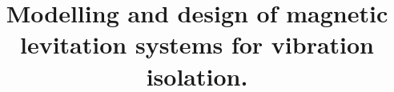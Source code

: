 \documentclass[11pt,a4paper]{memoir}
\begin{document}
\title{
Modelling and design of magnetic levitation systems for vibration isolation.
}

\begin{hideshorttoc}

\frontmatter
\pagestyle{plain}



\end{hideshorttoc}

\mainmatter
\null
\clearpage
\pagestyle{wspr}










\begin{hideshorttoc}
\backmatter
\clearpage


\clearpage
\end{hideshorttoc}

\thispagestyle{empty}
\null
\clearpage
\end{document}
